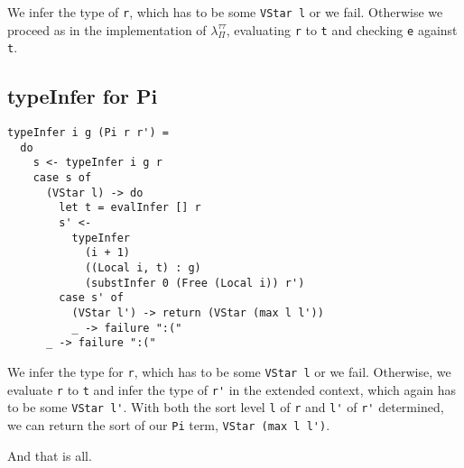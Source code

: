 \documentclass[runningheads]{llncs}
\begin{document}
We infer the type of \lstinline{r}, which has to be some \lstinline{VStar l} or
we fail. Otherwise we proceed as in the implementation of $\lambda_\Pi^{\tau
\tau}$, evaluating \lstinline{r} to \lstinline{t} and checking \lstinline{e}
against \lstinline{t}.

\subsection{typeInfer for Pi}

\begin{lstlisting}
typeInfer i g (Pi r r') =
  do
    s <- typeInfer i g r
    case s of
      (VStar l) -> do
        let t = evalInfer [] r
        s' <-
          typeInfer
            (i + 1)
            ((Local i, t) : g)
            (substInfer 0 (Free (Local i)) r')
        case s' of
          (VStar l') -> return (VStar (max l l'))
          _ -> failure ":("
      _ -> failure ":("
\end{lstlisting}

We infer the type for \lstinline{r}, which has to be some \lstinline{VStar l} or
we fail. Otherwise, we evaluate \lstinline{r} to \lstinline{t} and infer the
type of \lstinline{r'} in the extended context, which again has to be some
\lstinline{VStar l'}. With both the sort level \lstinline{l} of \lstinline{r}
and \lstinline{l'} of \lstinline{r'} determined, we can return the sort of our
\lstinline{Pi} term, \lstinline{VStar (max l l')}.

And that is all.

%
%
%
%  
%









\end{document}
